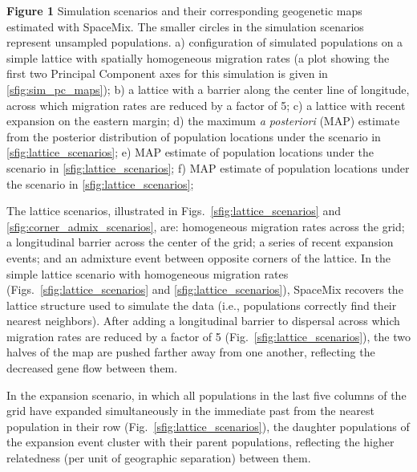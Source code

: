 \documentclass[10pt,letterpaper]{article}
\begin{document}
\begin{centering}
{\bf{Figure 1}}
    Simulation scenarios and their corresponding geogenetic maps estimated with SpaceMix.  
    The smaller circles in the simulation scenarios represent unsampled populations.  
    a) configuration of simulated populations on a simple lattice with spatially homogeneous migration rates (a plot showing the first two Principal Component axes for this simulation is given in \ref{sfig:sim_pc_maps}); 
    b) a lattice with a barrier along the center line of longitude, across which migration rates are reduced by a factor of 5; 
    c) a lattice with recent expansion on the eastern margin; 
    d) the maximum \textit{a posteriori} (MAP) estimate from the posterior distribution of population locations under the scenario in \ref{sfig:lattice_scenarios}; 
    e) MAP estimate of population locations under the scenario in \ref{sfig:lattice_scenarios};
    f) MAP estimate of population locations under the scenario in \ref{sfig:lattice_scenarios};
\end{centering}
\newline\newline

The lattice scenarios, illustrated in Figs.\ \ref{sfig:lattice_scenarios} and \ref{sfig:corner_admix_scenarios}, are: 
homogeneous migration rates across the grid; a longitudinal barrier across the center of the grid; a series of recent expansion events; and an admixture event between opposite corners of the lattice.  In the simple lattice scenario with homogeneous migration rates (Figs.\ \ref{sfig:lattice_scenarios} and \ref{sfig:lattice_scenarios}), SpaceMix recovers the lattice structure used to simulate the data (i.e., populations correctly find their nearest neighbors).  
After adding a longitudinal barrier to dispersal across which migration rates are reduced by a factor of 5 (Fig.\ \ref{sfig:lattice_scenarios}), 
the two halves of the map are pushed farther away from one another, 
reflecting the decreased gene flow between them.

In the expansion scenario, in which all populations in the last five columns of the grid have expanded simultaneously in the immediate past from the nearest population in their row (Fig.\ \ref{sfig:lattice_scenarios}), 
the daughter populations of the expansion event cluster with their parent populations, reflecting the higher relatedness (per unit of geographic separation) between them.
\end{document}
